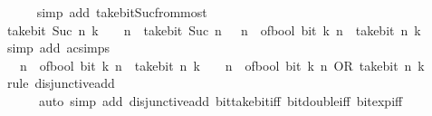 \begin{isabellebody}
\ \ \ \ \isamarkupfalse%
\ {\isacharparenleft}{\kern0pt}simp\ add{\isacharcolon}{\kern0pt}\ take{\isacharunderscore}{\kern0pt}bit{\isacharunderscore}{\kern0pt}Suc{\isacharunderscore}{\kern0pt}from{\isacharunderscore}{\kern0pt}most{\isacharparenright}{\kern0pt}\isanewline
\ \ \isamarkupfalse%
\ \isamarkupfalse%
\ {\isacartoucheopen}take{\isacharunderscore}{\kern0pt}bit\ {\isacharparenleft}{\kern0pt}Suc\ n{\isacharparenright}{\kern0pt}\ {\isacharparenleft}{\kern0pt}k\ {\isacharplus}{\kern0pt}\ {}\ {\isacharcircum}{\kern0pt}\ n{\isacharparenright}{\kern0pt}\ {\isacharequal}{\kern0pt}\ take{\isacharunderscore}{\kern0pt}bit\ {\isacharparenleft}{\kern0pt}Suc\ n{\isacharparenright}{\kern0pt}\ {\isacharparenleft}{\kern0pt}{}\ {\isacharcircum}{\kern0pt}\ {\isacharparenleft}{\kern0pt}n\ {\isacharplus}{\kern0pt}\ of{\isacharunderscore}{\kern0pt}bool\ {\isacharparenleft}{\kern0pt}bit\ k\ n{\isacharparenright}{\kern0pt}{\isacharparenright}{\kern0pt}\ {\isacharplus}{\kern0pt}\ take{\isacharunderscore}{\kern0pt}bit\ n\ k{\isacharparenright}{\kern0pt}{\isacartoucheclose}\isanewline
\ \ \ \ \isamarkupfalse%
\ {\isacharparenleft}{\kern0pt}simp\ add{\isacharcolon}{\kern0pt}\ ac{\isacharunderscore}{\kern0pt}simps{\isacharparenright}{\kern0pt}\isanewline
\ \ \isamarkupfalse%
\ \isamarkupfalse%
\ {\isacartoucheopen}{}\ {\isacharcircum}{\kern0pt}\ {\isacharparenleft}{\kern0pt}n\ {\isacharplus}{\kern0pt}\ of{\isacharunderscore}{\kern0pt}bool\ {\isacharparenleft}{\kern0pt}bit\ k\ n{\isacharparenright}{\kern0pt}{\isacharparenright}{\kern0pt}\ {\isacharplus}{\kern0pt}\ take{\isacharunderscore}{\kern0pt}bit\ n\ k\ {\isacharequal}{\kern0pt}\ {}\ {\isacharcircum}{\kern0pt}\ {\isacharparenleft}{\kern0pt}n\ {\isacharplus}{\kern0pt}\ of{\isacharunderscore}{\kern0pt}bool\ {\isacharparenleft}{\kern0pt}bit\ k\ n{\isacharparenright}{\kern0pt}{\isacharparenright}{\kern0pt}\ OR\ take{\isacharunderscore}{\kern0pt}bit\ n\ k{\isacartoucheclose}\isanewline
\ \ \ \ \isamarkupfalse%
\ {\isacharparenleft}{\kern0pt}rule\ disjunctive{\isacharunderscore}{\kern0pt}add{\isacharparenright}{\kern0pt}\isanewline
\ \ \ \ \ \ {\isacharparenleft}{\kern0pt}auto\ simp\ add{\isacharcolon}{\kern0pt}\ disjunctive{\isacharunderscore}{\kern0pt}add\ bit{\isacharunderscore}{\kern0pt}take{\isacharunderscore}{\kern0pt}bit{\isacharunderscore}{\kern0pt}iff\ bit{\isacharunderscore}{\kern0pt}double{\isacharunderscore}{\kern0pt}iff\ bit{\isacharunderscore}{\kern0pt}exp{\isacharunderscore}{\kern0pt}iff{\isacharparenright}{\kern0pt}\isanewline

\end{isabellebody}
